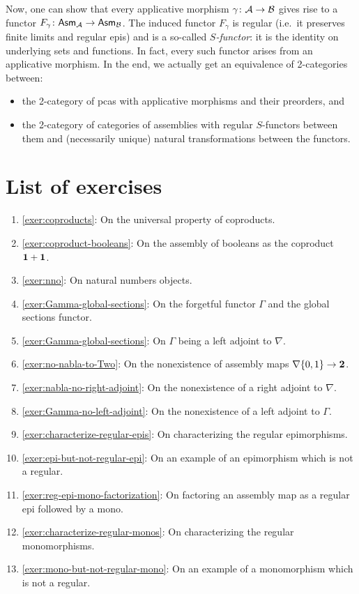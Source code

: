 Now, one can show that every applicative morphism \(\gamma \colon \mathcal A \to \mathcal B\)
gives rise to a functor \(F_\gamma \colon \mathsf{Asm}_{\mathcal A} \to \mathsf{Asm}_{\mathcal B}\).
%
The induced functor \(F_\gamma\) is regular (i.e.\ it preserves finite limits
and regular epis) and is a so-called \emph{\(S\)-functor}: it is the
identity on underlying sets and functions.
%
In fact, every such functor arises from an applicative morphism.
%
In the end, we actually get an equivalence of
2-categories~\cite[Theorem~1.6.2]{vanOosten2008} between:
\begin{itemize}
\item the 2-category of pcas with applicative morphisms and their preorders, and
\item the 2-category of categories of assemblies with regular \(S\)-functors between
  them and (necessarily unique) natural transformations between the functors.
\end{itemize}




\section{List of exercises}
\begin{enumerate}
\item \cref{exer:coproducts}: On the universal property of coproducts.
\item \cref{exer:coproduct-booleans}: On the assembly of booleans as the
  coproduct \(\mathbf 1 + \mathbf 1\).
\item \cref{exer:nno}: On natural numbers objects.
\item \cref{exer:Gamma-global-sections}: On the forgetful functor \(\Gamma\) and
  the global sections functor.
\item \cref{exer:Gamma-global-sections}: On \(\Gamma\) being a left adjoint to
  \(\nabla\).
\item \cref{exer:no-nabla-to-Two}: On the nonexistence of assembly maps
  \(\nabla\{0,1\} \to \mathbf 2\).
\item \cref{exer:nabla-no-right-adjoint}: On the nonexistence of a right
  adjoint to \(\nabla\).
\item \cref{exer:Gamma-no-left-adjoint}: On the nonexistence of a left
  adjoint to \(\Gamma\).
\item \cref{exer:characterize-regular-epis}: On characterizing the regular
  epimorphisms.
\item \cref{exer:epi-but-not-regular-epi}: On an example of an epimorphism
  which is not a regular.
\item \cref{exer:reg-epi-mono-factorization}: On factoring an assembly map as a
  regular epi followed by a mono.
\item \cref{exer:characterize-regular-monos}: On characterizing the regular
  monomorphisms.
\item \cref{exer:mono-but-not-regular-mono}: On an example of a monomorphism
  which is not a regular.
\end{enumerate}

